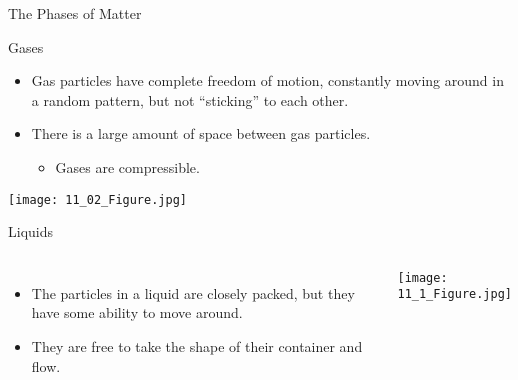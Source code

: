 \documentclass[notes=hide]{beamer}
\begin{document}
\begin{frame}{The Phases of Matter}

\end{frame}


\begin{frame}{Gases}
	\begin{itemize}
		\item Gas particles have complete freedom of motion, constantly
			moving around in a random pattern, but not ``sticking''
			to each other.
		\item There is a large amount of space between gas particles.
			\begin{itemize}
				\item Gases are compressible.
			\end{itemize}
	\end{itemize}

	\begin{center}
		\texttt{[image: 11\_02\_Figure.jpg]}
	\end{center}
\end{frame}


\begin{frame}{Liquids}
	\begin{columns}
		\begin{itemize}
			\item The particles in a liquid are closely packed, but
				they have some ability to move around.
			\item They are free to take the shape of their container
				and flow.
		\end{itemize}
		\begin{center}
			\texttt{[image: 11\_1\_Figure.jpg]}
		\end{center}
	\end{columns}
\end{frame}
\end{document}

